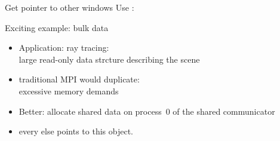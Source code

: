 \begin{numberedframe}{Get pointer to other windows}
  Use :
\end{numberedframe}


\begin{numberedframe}{Exciting example: bulk data}
  \begin{itemize}
  \item Application: ray tracing:\\
    large read-only data strcture describing the scene
  \item traditional MPI would duplicate:\\
    excessive memory demands
  \item Better: allocate shared data on process~0 of the shared communicator
  \item every else points to this object.
  \end{itemize}
\end{numberedframe}

\begin{exerciseframe}[shareddata]
    
\end{exerciseframe}

\endinput

\begin{numberedframe}{}
\begin{lstlisting}
  
\end{lstlisting}
\end{numberedframe}

